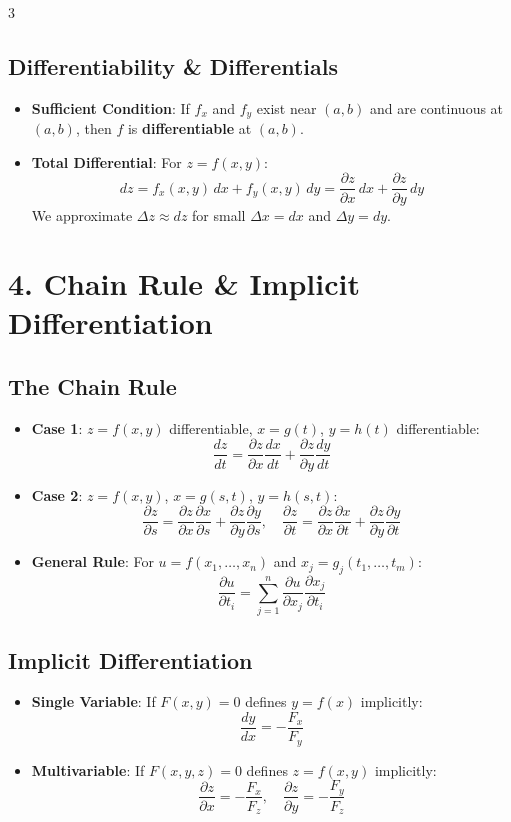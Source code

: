 \documentclass[10pt,landscape,a4paper]{article}
\begin{document}
\begin{multicols*}{3}
\subsection{Differentiability \& Differentials}
\begin{itemize}
    \item \textbf{Sufficient Condition}: If $f_x$ and $f_y$ exist near $(a,b)$ and are continuous at $(a,b)$, then $f$ is \textbf{differentiable} at $(a,b)$.
    \item \textbf{Total Differential}: For $z = f(x,y)$:
    \[ dz = f_x(x,y)\,dx + f_y(x,y)\,dy = \frac{\partial z}{\partial x}\,dx + \frac{\partial z}{\partial y}\,dy \]
    We approximate $\Delta z \approx dz$ for small $\Delta x = dx$ and $\Delta y = dy$.
\end{itemize}

\section{4. Chain Rule \& Implicit Differentiation}
\subsection{The Chain Rule}
\begin{itemize}
    \item \textbf{Case 1}: $z = f(x,y)$ differentiable, $x = g(t)$, $y = h(t)$ differentiable:
    \[ \frac{dz}{dt} = \frac{\partial z}{\partial x}\frac{dx}{dt} + \frac{\partial z}{\partial y}\frac{dy}{dt} \]
    \item \textbf{Case 2}: $z = f(x,y)$, $x = g(s,t)$, $y = h(s,t)$:
    \[ \frac{\partial z}{\partial s} = \frac{\partial z}{\partial x}\frac{\partial x}{\partial s} + \frac{\partial z}{\partial y}\frac{\partial y}{\partial s}, \quad \frac{\partial z}{\partial t} = \frac{\partial z}{\partial x}\frac{\partial x}{\partial t} + \frac{\partial z}{\partial y}\frac{\partial y}{\partial t} \]
    \item \textbf{General Rule}: For $u = f(x_1, \dots, x_n)$ and $x_j = g_j(t_1, \dots, t_m)$:
    \[ \frac{\partial u}{\partial t_i} = \sum_{j=1}^{n} \frac{\partial u}{\partial x_j} \frac{\partial x_j}{\partial t_i} \]
\end{itemize}

\subsection{Implicit Differentiation}
\begin{itemize}
    \item \textbf{Single Variable}: If $F(x,y) = 0$ defines $y = f(x)$ implicitly:
    \[ \frac{dy}{dx} = -\frac{F_x}{F_y} \]
    \item \textbf{Multivariable}: If $F(x,y,z) = 0$ defines $z = f(x,y)$ implicitly:
    \[ \frac{\partial z}{\partial x} = -\frac{F_x}{F_z}, \quad \frac{\partial z}{\partial y} = -\frac{F_y}{F_z} \]
\end{itemize}


\end{multicols*}
\end{document}
